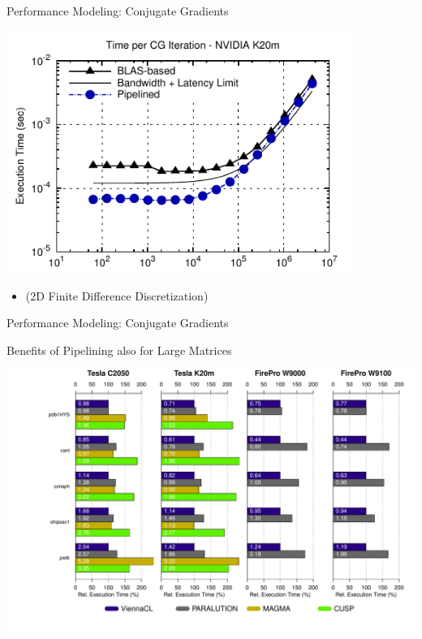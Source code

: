 \begin{frame}[fragile]{Performance Modeling: Conjugate Gradients}
 \begin{block}{}
 \begin{center}
  \vspace*{-0.5cm}
  \includegraphics[width=0.85\textwidth]{figures/cg-k20m-3}
 \end{center}

 \begin{itemize}
  \item   \vspace*{-0.3cm} {\small (2D Finite Difference Discretization)}
 \end{itemize}
 \end{block}   
\end{frame}



\begin{frame}[fragile]{Performance Modeling: Conjugate Gradients}
 \begin{block}{Benefits of Pipelining also for Large Matrices}
 \begin{center}
  \vspace*{-0.2cm}
  \hspace*{-1.5cm}\includegraphics[width=1.05\textwidth]{figures/cg}
 \end{center}
  \vspace*{0.2cm}

 \end{block}   
\end{frame}




